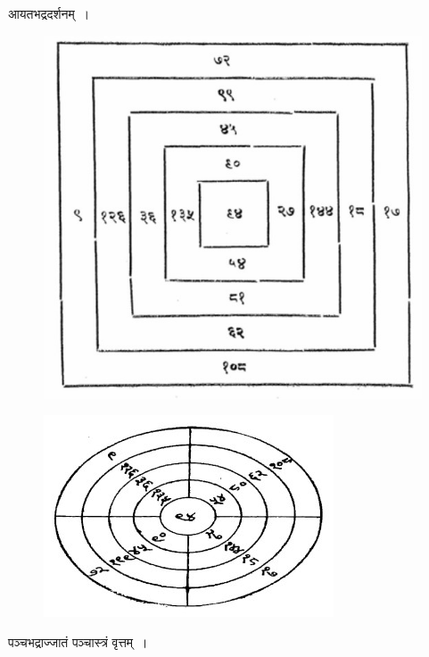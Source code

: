 \documentclass[11pt, openany]{book}
\begin{document}
\begin{center}
आयतभद्रदर्शनम्~।
\end{center}
\vspace{-6mm}

\begin{figure}[h!]
    \centering
    \includegraphics[scale=0.4]{graphics/425.jpg}
    
\end{figure}

\newpage

\begin{figure}[h!]
    \centering
    \includegraphics[scale=0.6]{graphics/426_1.jpg}
    
\end{figure}

\begin{center}
पञ्चभद्राज्जातं पञ्चास्त्रं वृत्तम्~।
\end{center}
\vspace{-6mm}
\end{document}
